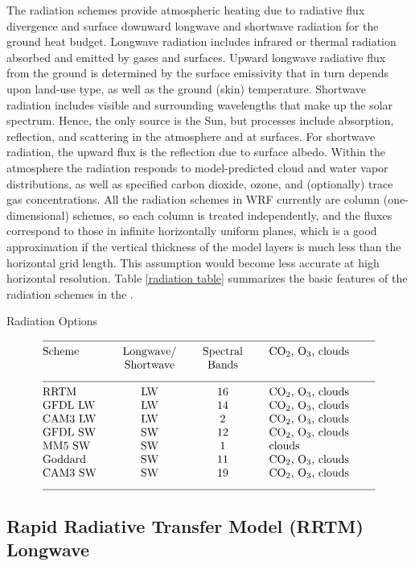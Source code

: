 The radiation schemes provide atmospheric heating due to radiative 
flux divergence and surface downward longwave and shortwave 
radiation for the ground heat budget. Longwave radiation includes 
infrared or thermal radiation absorbed and emitted by gases and surfaces. 
Upward longwave radiative flux from the ground is determined by the surface 
emissivity that in turn depends upon land-use type, as well as the ground (skin) 
temperature. Shortwave radiation includes visible and surrounding wavelengths 
that make up the solar spectrum. Hence, the only source is the Sun, but 
processes include absorption, reflection, and scattering in the atmosphere 
and at surfaces. For shortwave radiation, the upward flux is the reflection due to surface 
albedo. Within the atmosphere the radiation responds to model-predicted 
cloud and water vapor distributions, as well as specified carbon dioxide, 
ozone, and (optionally) trace gas concentrations. All the radiation schemes 
in WRF currently are column (one-dimensional) schemes, so each column is 
treated independently, and the fluxes correspond to those in 
infinite horizontally uniform  planes, which
is a good approximation if the vertical thickness of the model layers is much 
less than the horizontal grid length. This assumption would become less 
accurate at high horizontal resolution.
Table \ref{radiation table} summarizes the basic features of the radiation schemes
in the {\wrf}.

\begin{table}
\caption{Radiation Options}
\label{radiation table}
$$\vbox
{\halign{#\hfil \qquad & \hfil#\hfil \qquad &
\hfil#\hfil \qquad & #\hfil \qquad &  #\hfil \cr
\multispan4\hrulefill \cr
Scheme          &   Longwave/      &  Spectral      & CO$_2$, O$_3$, clouds              \cr
                &   Shortwave      &  Bands         &                      \cr
\multispan4\hrulefill \cr
RRTM            &  LW   &  16 &  CO$_2$, O$_3$, clouds  \cr
GFDL LW         &  LW   &  14 &  CO$_2$, O$_3$, clouds  \cr
CAM3 LW         &  LW   &  2  &  CO$_2$, O$_3$, clouds  \cr
GFDL SW         &  SW   &  12 &  CO$_2$, O$_3$, clouds  \cr
MM5  SW         &  SW   &  1  &   clouds   \cr
Goddard         &  SW   &  11  &  CO$_2$, O$_3$, clouds  \cr
CAM3 SW         &  SW   &  19  &  CO$_2$, O$_3$, clouds  \cr
\multispan4\hrulefill \cr
}}$$
\end{table}

\subsection{Rapid Radiative Transfer Model (RRTM) Longwave}


